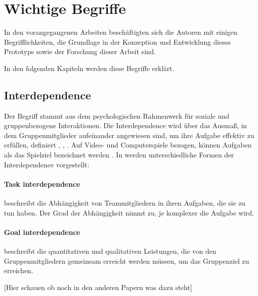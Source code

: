 

\section{Wichtige Begriffe}
In den vorangegangenen Arbeiten beschäftigten sich die Autoren mit einigen Begrifflichkeiten, die Grundlage in der Konzeption und Entwicklung dieses Prototyps sowie der Forschung dieser Arbeit sind. 

In den folgenden Kapiteln werden diese Begriffe erklärt.

\subsection{Interdependence}
Der Begriff  stammt aus dem psychologischen Rahmenwerk für soziale und gruppenbezogene Interaktionen. Die Interdependence wird über das Ausmaß, in dem Gruppenmitglieder aufeinander angewiesen sind, um ihre Aufgabe effektiv zu erfüllen, definiert \cite[S. 451]{depping_cooperation_2017}, \cite{saavedra_complex_1993}, \cite[S. 197:4]{holly_asymmetric_2023}. Auf Video- und Computerspiele bezogen, können Aufgaben als das Spielziel bezeichnet werden \cite[S. 451]{depping_cooperation_2017}. 
In \cite[S. 52]{van_der_vegt_patterns_2001} werden unterschiedliche Formen der Interdependence vorgestellt:
\paragraph{Task interdependence} beschreibt die Abhängigkeit von Teammitgliedern in ihren Aufgaben, die sie zu tun haben. Der Grad der Abhängigkeit nimmt zu, je komplexer die Aufgabe wird.
\paragraph{Goal interdependence} beschreibt die quantitativen und qualitativen Leistungen, die von den Gruppenmitgliedern gemeinsam erreicht werden müssen, um das Gruppenziel zu erreichen.

[Hier schauen ob noch in den anderen Papern was dazu steht]

